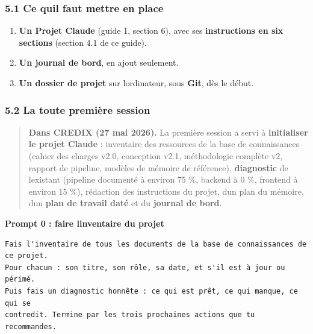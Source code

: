 \documentclass[
  french,
  11pt,
  a4paper,
]{article}
\providecommand{\tightlist}{%
  \setlength{\itemsep}{0pt}\setlength{\parskip}{0pt}}
\begin{document}
\subsubsection{5.1 Ce qu\textquotesingle il faut mettre en
place}\label{51-ce-quil-faut-mettre-en-place}

\begin{enumerate}
\def\labelenumi{\arabic{enumi}.}
\tightlist
\item
  \textbf{Un Projet Claude} (guide 1, section 6), avec ses
  \textbf{instructions en six sections} (section 4.1 de ce guide).
\item
  \textbf{Un journal de bord}, en ajout seulement.
\item
  \textbf{Un dossier de projet} sur l\textquotesingle ordinateur, sous
  \textbf{Git}, dès le début.
\end{enumerate}

\subsubsection{5.2 La toute première
session}\label{52-la-toute-premiuxe8re-session}

\begin{quote}
\textbf{Dans CREDIX (27 mai 2026).} La première session a servi à
\textbf{initialiser le projet Claude} : inventaire des ressources de la
base de connaissances (cahier des charges v2.0, conception v2.1,
méthodologie complète v2, rapport de pipeline, modèles de mémoire de
référence), \textbf{diagnostic} de l\textquotesingle existant (pipeline
documenté à environ 75 \%, backend à 0 \%, frontend à environ 15 \%),
rédaction des instructions du projet, d\textquotesingle un plan du
mémoire, d\textquotesingle un \textbf{plan de travail daté} et du
\textbf{journal de bord}.
\end{quote}

\textbf{Prompt 0 : faire l\textquotesingle inventaire du projet}

\begin{Verbatim}[breaklines=true,breakanywhere=true,fontsize=\small,frame=leftline,framerule=1.6pt,rulecolor=\color{credixblue},framesep=3mm,xleftmargin=2mm,xrightmargin=1mm]
Fais l'inventaire de tous les documents de la base de connaissances de ce projet.
Pour chacun : son titre, son rôle, sa date, et s'il est à jour ou périmé.
Puis fais un diagnostic honnête : ce qui est prêt, ce qui manque, ce qui se
contredit. Termine par les trois prochaines actions que tu recommandes.
\end{Verbatim}
\end{document}
